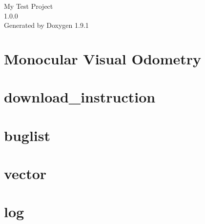 \let\mypdfximage\pdfximage\def\pdfximage{\immediate\mypdfximage}\documentclass[twoside]{book}
\newcommand{\+}{\discretionary{\mbox{\scriptsize$\hookleftarrow$}}{}{}}
\newcommand{\clearemptydoublepage}{%
  \newpage{\pagestyle{empty}\cleardoublepage}%
}
\begin{document}
\raggedbottom

\hypersetup{pageanchor=false,
             bookmarksnumbered=true,
             pdfencoding=unicode
            }
\begin{titlepage}
\vspace*{7cm}
\begin{center}%
{\Large My Test Project \\[1ex]\large 1.\+0.\+0 }\\
\vspace*{1cm}
{\large Generated by Doxygen 1.9.1}\\
\end{center}
\end{titlepage}
\clearemptydoublepage
{}
\tableofcontents
\clearemptydoublepage
{}
\hypersetup{pageanchor=true}

\chapter{Monocular Visual Odometry}
\label{index}\hypertarget{index}{}
\chapter{download\+\_\+instruction}
\label{md__home_deeishtay_Documents_Cpp_Monocular_Visual_Odometry_data_download_instruction}

\chapter{buglist}
\label{md__home_deeishtay_Documents_Cpp_Monocular_Visual_Odometry_doc_buglist}

\chapter{vector}
\label{md__home_deeishtay_Documents_Cpp_Monocular_Visual_Odometry_doc_coding_notes}

\chapter{log}
\label{md__home_deeishtay_Documents_Cpp_Monocular_Visual_Odometry_doc_log}

\end{document}
